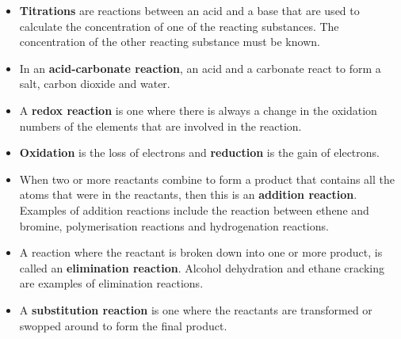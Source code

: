 \begin{itemize}
\item{\textbf{Titrations} are reactions between an acid and a base that are used to calculate the concentration of one of the reacting substances. The concentration of the other reacting substance must be known.}
\item{In an \textbf{acid-carbonate reaction}, an acid and a carbonate react to form a salt, carbon dioxide and water.}
\item{A \textbf{redox reaction} is one where there is always a change in the oxidation numbers of the elements that are involved in the reaction.}
\item{\textbf{Oxidation} is the loss of electrons and \textbf{reduction} is the gain of electrons.}
\item{When two or more reactants combine to form a product that contains all the atoms that were in the reactants, then this is an \textbf{addition reaction}. Examples of addition reactions include the reaction between ethene and bromine, polymerisation reactions and hydrogenation reactions.}
\item{A reaction where the reactant is broken down into one or more product, is called an \textbf{elimination reaction}. Alcohol dehydration and ethane cracking are examples of elimination reactions.}
\item{A \textbf{substitution reaction} is one where the reactants are transformed or swopped around to form the final product.}
\end{itemize}

